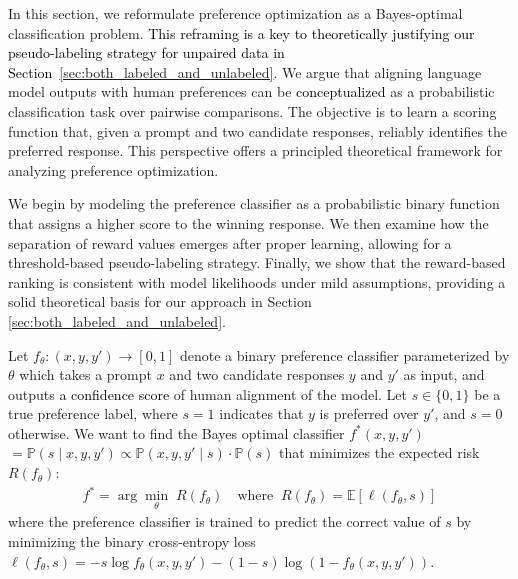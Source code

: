 \documentclass{article} %
\newcommand\fix[1]{\textcolor{black}{#1}}
\newcommand\turnitin[1]{\textcolor{black}{#1}}
\begin{document}
In this section, we reformulate preference optimization as a Bayes-optimal classification problem. \fix{This reframing is a key to theoretically justifying our pseudo-labeling strategy for unpaired data in Section~\ref{sec:both_labeled_and_unlabeled}}. We argue that aligning language model outputs with human preferences can be \turnitin{conceptualized} as a probabilistic classification task over pairwise comparisons. The objective is to learn a scoring function that, given a prompt and two candidate responses, reliably identifies the preferred response. This perspective offers a principled theoretical framework for analyzing preference optimization.

We begin by modeling the preference classifier as a probabilistic binary function that assigns a higher score to the winning response. We then examine how the separation of reward values emerges after proper learning, allowing for a threshold-based pseudo-labeling strategy. Finally, we show that the reward-based ranking is consistent with model likelihoods under mild assumptions, providing a solid theoretical basis for our approach in Section \ref{sec:both_labeled_and_unlabeled}.

Let $f_\theta: (x, y, y') \rightarrow [0, 1]$ denote a binary preference classifier parameterized by $\theta$ which takes a prompt $x$ and two candidate responses $y$ and $y'$ as input, and outputs \fix{a confidence score} of human alignment of the model. Let $s \in \{0, 1\}$ be a true preference label, where $s = 1$ indicates that $y$ is preferred over $y'$, and $s = 0$ otherwise.
We want to find the Bayes optimal classifier $f^{*}(x,y,y')$ $=\mathbb{P}(s \mid x,y,y') \propto \mathbb{P}(x,y,y' \mid s) \cdot \mathbb{P}(s) $ that minimizes the expected risk $R(f_\theta)$:
\begin{align}
    f^{*}=\arg\min_{\theta}  \; R(f_\theta) \quad \text{where} \;\;R(f_\theta) = \mathbb{E}[\ell(f_\theta,s)]
\end{align}
where the preference classifier is trained to predict the correct value of $s$ by minimizing the binary cross-entropy loss $\ell(f_\theta, s) = -s \log f_\theta(x, y, y') - (1 - s) \log(1 - f_\theta(x, y, y'))$.
\end{document}
